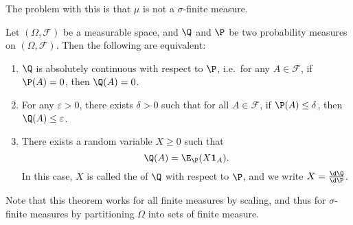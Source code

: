 \documentclass[a4paper]{article}
\begin{document}
The problem with this is that $\mu$ is not a $\sigma$-finite measure.

\begin{thm}
  Let $(\Omega, \mathcal{F})$ be a measurable space, and $\Q$ and $\P$ be two probability measures on $(\Omega, \mathcal{F})$. Then the following are equivalent:
  \begin{enumerate}
    \item $\Q$ is absolutely continuous with respect to $\P$, i.e.\ for any $A \in \mathcal{F}$, if $\P(A) = 0$, then $\Q(A) = 0$.
    \item For any $\varepsilon > 0$, there exists $\delta > 0$ such that for all $A \in \mathcal{F}$, if $\P(A) \leq \delta$, then $\Q(A) \leq \varepsilon$.
    \item There exists a random variable $X \geq 0$ such that
      \[
        \Q(A) = \E_{\P}(X \mathbf{1}_A).
      \]
      In this case, $X$ is called the  of $\Q$ with respect to $\P$, and we write $X = \frac{\d \Q}{\d \P}$.
  \end{enumerate}
\end{thm}
Note that this theorem works for all finite measures by scaling, and thus for $\sigma$-finite measures by partitioning $\Omega$ into sets of finite measure.
\end{document}
